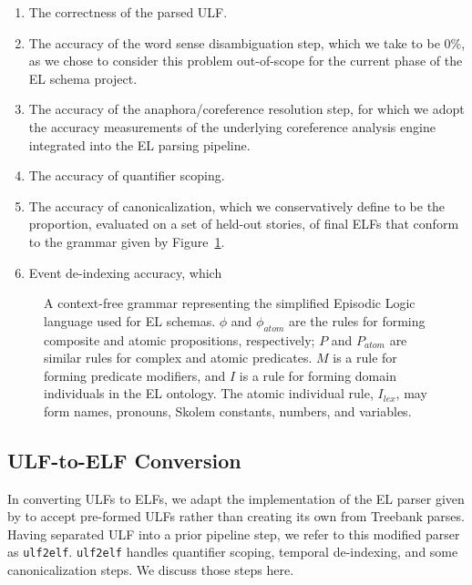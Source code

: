 \begin{enumerate}
    \item The correctness of the parsed ULF.
    \item The accuracy of the word sense disambiguation step, which we take to be $0\%$, as we chose to consider this problem out-of-scope for the current phase of the EL schema project.
    \item The accuracy of the anaphora/coreference resolution step, for which we adopt the accuracy measurements of the underlying coreference analysis engine integrated into the EL parsing pipeline.
    \item The accuracy of quantifier scoping.
    \item The accuracy of canonicalization, which we conservatively define to be the proportion, evaluated on a set of held-out stories, of final ELFs that conform to the grammar given by Figure~\ref{fig:el_cfg}.
    \item Event de-indexing accuracy, which
\end{enumerate}

\begin{figure}
    \centering
    
    \normalsize
    \caption{A context-free grammar representing the simplified Episodic Logic language used for EL schemas. $\phi$ and $\phi_{atom}$ are the rules for forming composite and atomic propositions, respectively; $P$ and $P_{atom}$ are similar rules for complex and atomic predicates. $M$ is a rule for forming predicate modifiers, and $I$ is a rule for forming domain individuals in the EL ontology. The atomic individual rule, $I_{lex}$, may form names, pronouns, Skolem constants, numbers, and variables.}
    \label{fig:el_cfg}
\end{figure}

\subsection{ULF-to-ELF Conversion}
In converting ULFs to ELFs, we adapt the implementation of the EL parser given by \citet{schubert-2014-treebank} to accept pre-formed ULFs rather than creating its own from Treebank parses. Having separated ULF into a prior pipeline step, we refer to this modified parser as \texttt{ulf2elf}. \texttt{ulf2elf} handles quantifier scoping, temporal de-indexing, and some canonicalization steps. We discuss those steps here.

